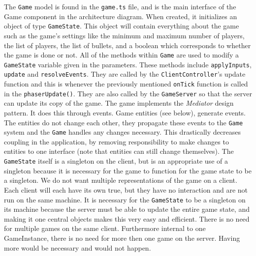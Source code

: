 \documentclass[12pt]{report}
\begin{document}
The \texttt{Game} model is found in the \texttt{game.ts} file, and is the main interface of the Game component in the architecture diagram. When created, it initializes an object of type \texttt{GameState}. This object will contain everything about the game such as the game's settings like the minimum and maximum number of players, the list of players, the list of bullets, and a boolean which corresponds to whether the game is done or not. All of the methods within \texttt{Game} are used to modify a \texttt{GameState} variable given in the parameters. These methods include \texttt{applyInputs}, \texttt{update} and \texttt{resolveEvents}. They are called by the \texttt{ClientController}'s update function and this is whenever the previously mentioned \texttt{onTick} function is called in the \texttt{phaserUpdate()}. They are also called by the \texttt{GameServer} so that the server can update its copy of the game. The game implements the \textit{Mediator} design pattern. It does this through events. Game entities (see below), generate events. The entities do not change each other, they propagate these events to the \texttt{Game} system and the \texttt{Game} handles any changes necessary. This drastically decreases coupling in the application, by removing responsibility to make changes to entities to one interface (note that entities can still change themselves). The \texttt{GameState} itself is a singleton on the client, but is an appropriate use of a singleton because it is necessary for the game to function for the game state to be a singleton. We do not want multiple representations of the game on a client. Each client will each have its own true, but they have no interaction and are not run on the same machine. It is necessary for the \texttt{GameState} to be a singleton on its machine because the server must be able to update the entire game state, and making it one central objects makes this very easy and efficient. There is no need for multiple games on the same client. Furthermore internal to one GameInstance, there is no need for more then one game on the server. Having more would be necessary and would not happen. 
\end{document}
